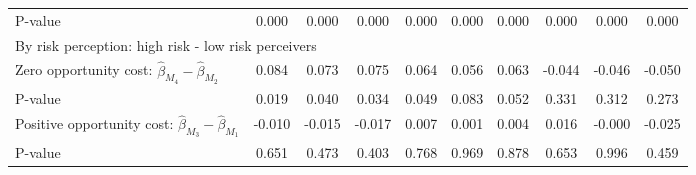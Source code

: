 \begin{tabular}{l*{9}{c}}
\quad P-value       &       0.000         &       0.000         &       0.000         &       0.000         &       0.000         &       0.000         &       0.000         &       0.000         &       0.000         \\
\multicolumn{10}{l}{By risk perception: high risk - low risk perceivers} \\ \quad Zero opportunity cost: $\hat\beta_{M_4} - \hat\beta_{M_2}$&       0.084         &       0.073         &       0.075         &       0.064         &       0.056         &       0.063         &      -0.044         &      -0.046         &      -0.050         \\
\quad P-value       &       0.019         &       0.040         &       0.034         &       0.049         &       0.083         &       0.052         &       0.331         &       0.312         &       0.273         \\
\quad Positive opportunity cost: $\hat\beta_{M_3} - \hat\beta_{M_1}$&      -0.010         &      -0.015         &      -0.017         &       0.007         &       0.001         &       0.004         &       0.016         &      -0.000         &      -0.025         \\
\quad P-value       &       0.651         &       0.473         &       0.403         &       0.768         &       0.969         &       0.878         &       0.653         &       0.996         &       0.459         \\
\hline\hline \end{tabular}
